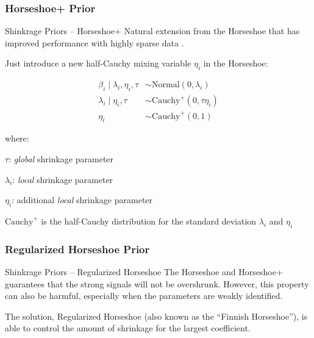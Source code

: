 \subsubsection{Horseshoe+ Prior}
\begin{frame}{Shinkrage Priors -- Horseshoe+}
    Natural extension from the Horseshoe that has improved performance with
    highly sparse data \parencite{bhadra2015horseshoe}.

    \vfill

    Just introduce a new half-Cauchy mixing variable $\eta_i$ in the Horseshoe:

    $$
        \begin{aligned}
            \beta_i \mid \lambda_i, \eta_i, \tau &\sim \text{Normal}(0, \lambda_i) \\
            \lambda_i \mid \eta_i, \tau &\sim \text{Cauchy}^+ (0, \tau \eta_i) \\
            \eta_i &\sim \text{Cauchy}^+ (0, 1)
        \end{aligned}
    $$

    where:
    \begin{vfilleditems}
        \item $\tau$: \textit{global} shrinkage parameter
        \item $\lambda_i$: \textit{local} shrinkage parameter
        \item $\eta_i$: additional \textit{local} shrinkage parameter
        \item $\text{Cauchy}^+$ is the half-Cauchy distribution for the
            standard deviation $\lambda_i$ and $\eta_i$
    \end{vfilleditems}
\end{frame}

\subsubsection{Regularized Horseshoe Prior}
\begin{frame}{Shinkrage Priors -- Regularized Horseshoe}
    The Horseshoe and Horseshoe+ guarantees that the strong signals will not
    be overshrunk.
    However, this property can also be harmful,
    especially when the parameters are weakly identified.

    \vfill

    The solution, Regularized Horseshoe \parencite{piironen2017horseshoe}
    (also known as the ``Finnish Horseshoe''),
    is able to control the amount of shrinkage for the largest coefficient.
\end{frame}

